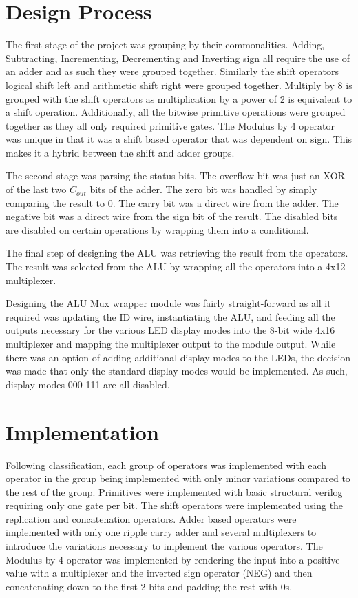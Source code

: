 \documentclass[12pt,letterpaper,titlepage]{article}
\begin{document}
\begin{raggedright}
\clearpage

\section{Design Process}
The first stage of the project was grouping by their commonalities. Adding, Subtracting, Incrementing, Decrementing and Inverting sign all require the use of an adder and as such they were grouped together. Similarly the shift operators logical shift left and arithmetic shift right were grouped together. Multiply by 8 is grouped with the shift operators as multiplication by a power of 2 is equivalent to a shift operation. Additionally, all the bitwise primitive operations were grouped together as they all only required primitive gates. The Modulus by 4 operator was unique in that it was a shift based operator that was dependent on sign. This makes it a hybrid between the shift and adder groups.

The second stage was parsing the status bits. The overflow bit was just an XOR of the last two $C_{out}$ bits of the adder. The zero bit was handled by simply comparing the result to 0. The carry bit was a direct wire from the adder. The negative bit was a direct wire from the sign bit of the result. The disabled bits are disabled on certain operations by wrapping them into a conditional.

The final step of designing the ALU was retrieving the result from the operators. The result was selected from the ALU by wrapping all the operators into a 4x12 multiplexer.

Designing the ALU Mux wrapper module was fairly straight-forward as all it required was updating the ID wire, instantiating the ALU, and feeding all the outputs necessary for the various LED display modes into the 8-bit wide 4x16 multiplexer and mapping the multiplexer output to the module output. While there was an option of adding additional display modes to the LEDs, the decision was made that only the standard display modes would be implemented. As such, display modes 000-111 are all disabled.

\section{Implementation}
Following classification, each group of operators was implemented with each operator in the group being implemented with only minor variations compared to the rest of the group. Primitives were implemented with basic structural verilog requiring only one gate per bit. The shift operators were implemented using the replication and concatenation operators. Adder based operators were implemented with only one ripple carry adder and several multiplexers to introduce the variations necessary to implement the various operators. The Modulus by 4 operator was implemented by rendering the input into a positive value with a multiplexer and the inverted sign operator (NEG) and then concatenating down to the first 2 bits and padding the rest with 0s.


\end{raggedright}
\end{document}
